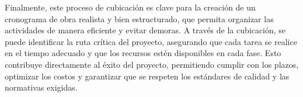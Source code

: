 \documentclass{article} %
\begin{document}
Finalmente, este proceso de cubicación es clave para la creación de un cronograma de obra realista y bien estructurado, que permita organizar las actividades de manera eficiente y evitar demoras. A través de la cubicación, se puede identificar la ruta crítica del proyecto, asegurando que cada tarea se realice en el tiempo adecuado y que los recursos estén disponibles en cada fase. Esto contribuye directamente al éxito del proyecto, permitiendo cumplir con los plazos, optimizar los costos y garantizar que se respeten los estándares de calidad y las normativas exigidas.
\end{document}
